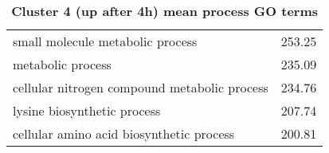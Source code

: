 \begin{table}[hp]
\begin{center}
\begin{tabular}{p{}r}
small molecule metabolic process                              & 253.25                      \\
metabolic process                                             & 235.09                      \\
cellular nitrogen compound metabolic process                  & 234.76                      \\
lysine biosynthetic process                                   & 207.74                      \\
cellular amino acid biosynthetic process                      & 200.81                      \\ \bottomrule                                                           
\end{tabular}
\end{center}

\caption[Cluster 4 (up after 4h) mean process GO terms]{\sf \textbf{Cluster 4 (up after 4h) mean process GO terms}}
\label{tab:cls4-process}
\end{table}
